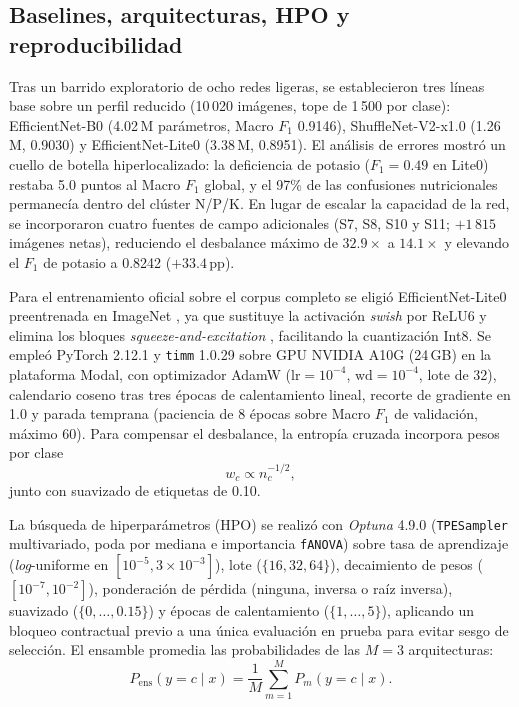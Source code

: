 \documentclass[conference,letterpaper]{IEEEtran}
\newcommand{\Fone}{$F_1$}
\begin{document}
\subsection{Baselines, arquitecturas, HPO y reproducibilidad}
Tras un barrido exploratorio de ocho redes ligeras, se establecieron tres líneas base sobre un perfil reducido (10\,020 imágenes, tope de 1\,500 por clase): EfficientNet-B0 (4.02\,M parámetros, Macro \Fone{} 0.9146), ShuffleNet-V2-x1.0 (1.26\,M, 0.9030) y EfficientNet-Lite0 (3.38\,M, 0.8951). El análisis de errores mostró un cuello de botella hiperlocalizado: la deficiencia de potasio ($F_1=0.49$ en Lite0) restaba 5.0 puntos al Macro \Fone{} global, y el 97\% de las confusiones nutricionales permanecía dentro del clúster N/P/K. En lugar de escalar la capacidad de la red, se incorporaron cuatro fuentes de campo adicionales (S7, S8, S10 y S11; $+1\,815$ imágenes netas), reduciendo el desbalance máximo de $32.9\times$ a $14.1\times$ y elevando el \Fone{} de potasio a 0.8242 ($+33.4$\,pp).

Para el entrenamiento oficial sobre el corpus completo se eligió EfficientNet-Lite0 preentrenada en ImageNet \cite{deng2009}, ya que sustituye la activación \textit{swish} por ReLU6 y elimina los bloques \textit{squeeze-and-excitation} \cite{hu2018}, facilitando la cuantización Int8. Se empleó PyTorch 2.12.1 y \texttt{timm} 1.0.29 sobre GPU NVIDIA A10G (24\,GB) en la plataforma Modal, con optimizador AdamW ($\text{lr}=10^{-4}$, $\text{wd}=10^{-4}$, lote de 32), calendario coseno tras tres épocas de calentamiento lineal, recorte de gradiente en 1.0 y parada temprana (paciencia de 8 épocas sobre Macro \Fone{} de validación, máximo 60). Para compensar el desbalance, la entropía cruzada incorpora pesos por clase
\begin{equation}
w_c \propto n_c^{-1/2},
\label{eq:pesos}
\end{equation}
junto con suavizado de etiquetas de 0.10.

La búsqueda de hiperparámetros (HPO) se realizó con \textit{Optuna} 4.9.0 \cite{akiba2019} (\texttt{TPESampler} multivariado, poda por mediana e importancia \texttt{fANOVA}) sobre tasa de aprendizaje (\textit{log}-uniforme en $[10^{-5},3\times10^{-3}]$), lote ($\{16,32,64\}$), decaimiento de pesos ($[10^{-7},10^{-2}]$), ponderación de pérdida (ninguna, inversa o raíz inversa), suavizado ($\{0,\dots,0.15\}$) y épocas de calentamiento ($\{1,\dots,5\}$), aplicando un bloqueo contractual previo a una única evaluación en prueba para evitar sesgo de selección. El ensamble promedia las probabilidades de las $M=3$ arquitecturas:
\begin{equation}
P_{\text{ens}}(y=c\mid x)=\frac{1}{M}\sum_{m=1}^{M}P_m(y=c\mid x).
\label{eq:ensamble}
\end{equation}
\end{document}
